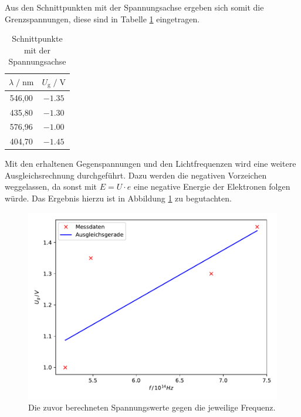 Aus den Schnittpunkten mit der Spannungsachse ergeben sich somit die Grenzspannungen, 
diese sind in Tabelle \ref{tab:gegen} eingetragen. 

\begin{table}
    \centering
    \caption{Schnittpunkte mit der Spannungsachse}
    \label{tab:gegen}
    \begin{tabular}{c c}
    \toprule
    $ \lambda \;/\; \si{\nano\meter} $ & $U_\text{g} \;/\; \si{\volt}$\\
    \midrule 
      546,00 & $\num{-1.35}$\\ %
      435,80 & $\num{-1.30}$\\ %
      576,96 & $\num{-1.00}$\\ %
      404,70 & $\num{-1.45}$\\ %
    \bottomrule
    \end{tabular}
\end{table}

Mit den erhaltenen Gegenspannungen und den Lichtfrequenzen wird eine weitere Ausgleichsrechnung 
durchgeführt. Dazu werden die negativen Vorzeichen weggelassen, da sonst mit $E = U\cdot e$ eine 
negative Energie der Elektronen folgen würde. Das Ergebnis hierzu ist in Abbildung \ref{fig:plot2} zu 
begutachten. 

\begin{figure}
  \centering
  \includegraphics{content/plot2.pdf}
  \caption{Die zuvor berechneten Spannungswerte gegen die jeweilige Frequenz.}
  \label{fig:plot2}
\end{figure}

